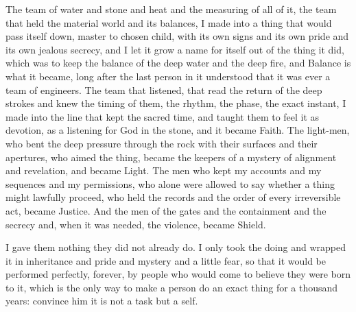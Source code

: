 The team of water and stone and heat and the measuring of all of it, the team that held the material world and its balances, I made into a thing that would pass itself down, master to chosen child, with its own signs and its own pride and its own jealous secrecy, and I let it grow a name for itself out of the thing it did, which was to keep the balance of the deep water and the deep fire, and Balance is what it became, long after the last person in it understood that it was ever a team of engineers. The team that listened, that read the return of the deep strokes and knew the timing of them, the rhythm, the phase, the exact instant, I made into the line that kept the sacred time, and taught them to feel it as devotion, as a listening for God in the stone, and it became Faith. The light-men, who bent the deep pressure through the rock with their surfaces and their apertures, who aimed the thing, became the keepers of a mystery of alignment and revelation, and became Light. The men who kept my accounts and my sequences and my permissions, who alone were allowed to say whether a thing might lawfully proceed, who held the records and the order of every irreversible act, became Justice. And the men of the gates and the containment and the secrecy and, when it was needed, the violence, became Shield.\par

I gave them nothing they did not already do. I only took the doing and wrapped it in inheritance and pride and mystery and a little fear, so that it would be performed perfectly, forever, by people who would come to believe they were born to it, which is the only way to make a person do an exact thing for a thousand years: convince him it is not a task but a self.\par

